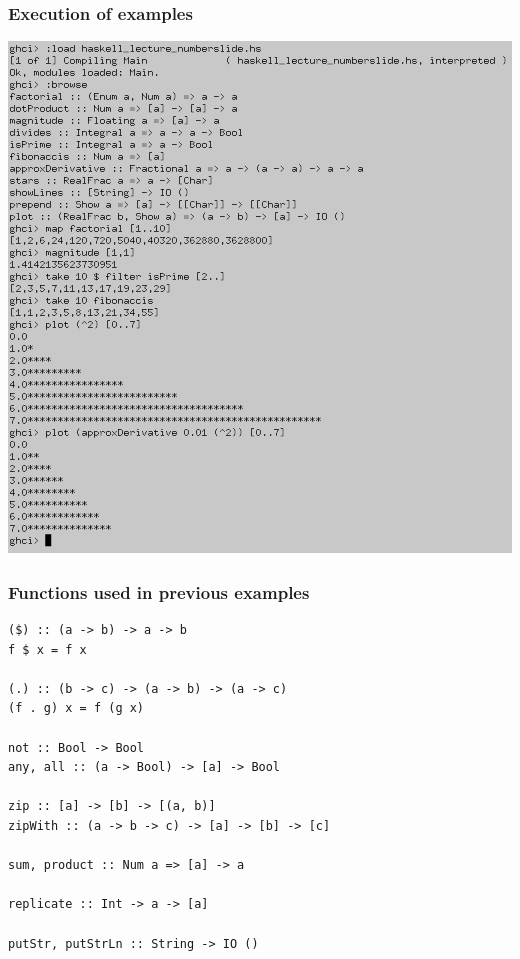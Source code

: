 \documentclass{beamer}
\begin{document}
\begin{frame}[fragile]
\frametitle{Execution of examples}
\includegraphics[scale=0.25]{haskell_lecture_numberslide_ghci1_cropped.png}
\end{frame}

\begin{frame}[fragile]
\frametitle{Functions used in previous examples}
\begin{Verbatim}[frame=single, fontsize=\scriptsize]
($) :: (a -> b) -> a -> b
f $ x = f x

(.) :: (b -> c) -> (a -> b) -> (a -> c)
(f . g) x = f (g x)

not :: Bool -> Bool
any, all :: (a -> Bool) -> [a] -> Bool

zip :: [a] -> [b] -> [(a, b)]
zipWith :: (a -> b -> c) -> [a] -> [b] -> [c]

sum, product :: Num a => [a] -> a

replicate :: Int -> a -> [a]

putStr, putStrLn :: String -> IO ()
\end{Verbatim}
\end{frame}
\end{document}
